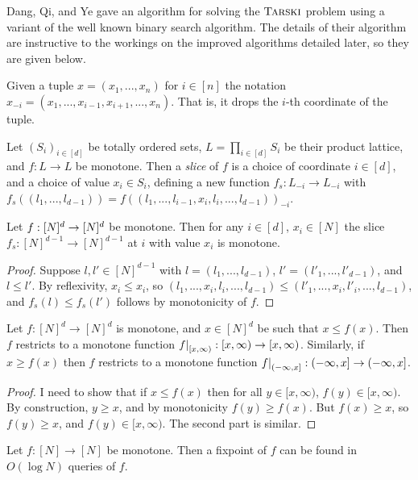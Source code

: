 Dang, Qi, and Ye gave an algorithm for solving the $\textsc{Tarski}$ problem\citep{dangQiYe} using a variant of the well
known binary search algorithm. The details of their algorithm are instructive
to the workings on the improved algorithms detailed  later, so they are given below.
\begin{notation}
  Given a tuple $x = (x_1, ..., x_n)$ for $i \in [n]$ the notation $x_{-i} = (x_1, ..., x_{i-1}, x_{i+1}, ..., x_n)$. That is, it drops
  the $i$-th coordinate of the tuple.
\end{notation}
\begin{definition}[Slice] \label{sliceDef}
  Let $(S_i)_{i \in [d]}$ be totally ordered sets, $L = \prod_{i \in [d]} S_i$
  be their product lattice, and $f : L \to L$ be monotone. 
  Then a \emph{slice} of $f$ is a choice of coordinate $i \in [d]$,
  and a choice of value $x_i \in S_i$, defining a new function 
  $f_s : L_{-i} \to L_{-i}$ with
  $f_s((l_1, ..., l_{d-1})) = f((l_1, ..., l_{i-1},  x_i, l_i, ..., l_{d-1}))_{-i}$.
\end{definition}
\begin{lemma} \label{sliceMonotone}
  Let $f : [N]^d \to [N]^d$ be monotone. Then for any $i \in [d]$, $x_i \in [N]$ the slice $f_s : [N]^{d-1} \to [N]^{d-1}$ at $i$ with value $x_i$  
  is monotone. 
\end{lemma}
\begin{proof}
  Suppose $l, l' \in [N]^{d-1}$ with $l = (l_1, ..., l_{d-1})$, $l' = (l'_1, ..., l'_{d-1})$, and $l \leq l'$.
  By reflexivity, $x_i \leq x_i$, so $(l_1, ... , x_i, l_i, ..., l_{d-1}) \leq (l'_1, ... , x_i, l'_i, ..., l_{d-1})$,
  and $f_s(l) \leq f_s(l')$ follows by monotonicity of $f$.
\end{proof}
\begin{lemma}\label{restricts}
  Let $f : [N]^d \to [N]^d$ is monotone, and $x \in [N]^d$ be such that $x \leq f(x)$. Then
  $f$ restricts to a monotone function $\restr{f}{[x, \infty)} : [x, \infty) \to [x, \infty)$. Similarly,
  if $x \geq f(x)$ then $f$ restricts to a monotone function $\restr{f}{(-\infty, x]} : (-\infty, x] \to (-\infty, x]$.
\end{lemma}
\begin{proof}
  I need to show that if $x \leq f(x)$ then for all $y \in [x, \infty)$, $f(y) \in [x, \infty)$. By construction,
  $y \geq x$, and by monotonicity $f(y) \geq f(x)$. But $f(x) \geq x$, so $f(y) \geq x$, and $f(y) \in [x, \infty)$. The second part
  is similar.
\end{proof}
\begin{lemma}\label{d1Case}
  Let $f : [N] \to [N]$ be monotone. Then a fixpoint of $f$ can be found in $O(\log N)$ queries of $f$.
\end{lemma}
